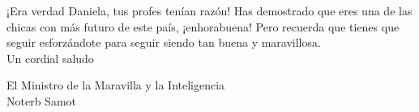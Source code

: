 \documentclass[svgnames,addpoints]{exam}
\begin{document}
\vspace*{1.6cm}

\begin{center}
  
    \begin{minipage}{13cm}

    ¡Era verdad Daniela, tus profes tenían razón! Has demostrado que eres una de las chicas con más futuro de este país, ¡enhorabuena! Pero recuerda que tienes que seguir esforzándote para seguir siendo tan buena y maravillosa.\\ 

    Un cordial saludo

    \vspace*{1.5cm}

    El Ministro de la  Maravilla y la Inteligencia\\
    Noterb Samot

    \end{minipage}
\end{center}
\end{document}
